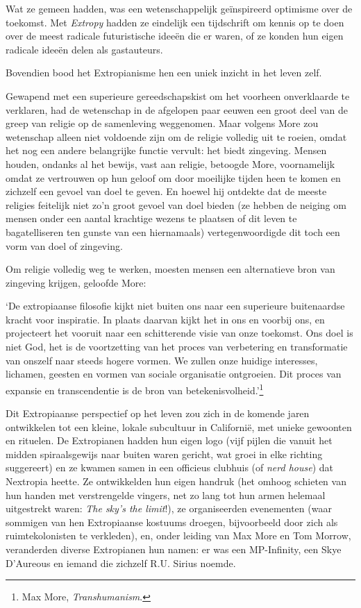 \documentclass[
  a5paper,
  smalldemyvopaper,11pt,twoside,onecolumn,openright,extrafontsizes,
hidelinks]{memoir}
\renewenvironment{quote}%
               {\list{}{\rightmargin=.3cm\leftmargin=.3cm}%
                \itshape \item[]}%
               {\endlist}
\begin{document}
Wat ze gemeen hadden, was een wetenschappelijk geïnspireerd optimisme
over de toekomst. Met \emph{Extropy} hadden ze eindelijk een tijdschrift
om kennis op te doen over de meest radicale futuristische ideeën die er
waren, of ze konden hun eigen radicale ideeën delen als gastauteurs.

Bovendien bood het Extropianisme hen een uniek inzicht in het leven
zelf.

Gewapend met een superieure gereedschapskist om het voorheen
onverklaarde te verklaren, had de wetenschap in de afgelopen paar eeuwen
een groot deel van de greep van religie op de samenleving weggenomen.
Maar volgens More zou wetenschap alleen niet voldoende zijn om de
religie volledig uit te roeien, omdat het nog een andere belangrijke
functie vervult: het biedt zingeving. Mensen houden, ondanks al het
bewijs, vast aan religie, betoogde More, voornamelijk omdat ze
vertrouwen op hun geloof om door moeilijke tijden heen te komen en
zichzelf een gevoel van doel te geven. En hoewel hij ontdekte dat de
meeste religies feitelijk niet zo'n groot gevoel van doel bieden (ze
hebben de neiging om mensen onder een aantal krachtige wezens te
plaatsen of dit leven te bagatelliseren ten gunste van een hiernamaals)
vertegenwoordigde dit toch een vorm van doel of zingeving.

Om religie volledig weg te werken, moesten mensen een alternatieve bron
van zingeving krijgen, geloofde More:

\begin{quote}
`De extropiaanse filosofie kijkt niet buiten ons naar een superieure
buitenaardse kracht voor inspiratie. In plaats daarvan kijkt het in ons
en voorbij ons, en projecteert het vooruit naar een schitterende visie
van onze toekomst. Ons doel is niet God, het is de voortzetting van het
proces van verbetering en transformatie van onszelf naar steeds hogere
vormen. We zullen onze huidige interesses, lichamen, geesten en vormen
van sociale organisatie ontgroeien. Dit proces van expansie en
transcendentie is de bron van betekenisvolheid.'\footnote{Max More,
  \emph{Transhumanism}.}
\end{quote}

Dit Extropiaanse perspectief op het leven zou zich in de komende jaren
ontwikkelen tot een kleine, lokale subcultuur in Californië, met unieke
gewoonten en rituelen. De Extropianen hadden hun eigen logo (vijf pijlen
die vanuit het midden spiraalsgewijs naar buiten waren gericht, wat
groei in elke richting suggereert) en ze kwamen samen in een officieus
clubhuis (of \emph{nerd house}) dat Nextropia heette. Ze ontwikkelden
hun eigen handruk (het omhoog schieten van hun handen met verstrengelde
vingers, net zo lang tot hun armen helemaal uitgestrekt waren: \emph{The
sky's the limit}!), ze organiseerden evenementen (waar sommigen van hen
Extropiaanse kostuums droegen, bijvoorbeeld door zich als
ruimtekolonisten te verkleden), en, onder leiding van Max More en Tom
Morrow, veranderden diverse Extropianen hun namen: er was een
MP-Infinity, een Skye D'Aureous en iemand die zichzelf R.U. Sirius
noemde.
\end{document}
